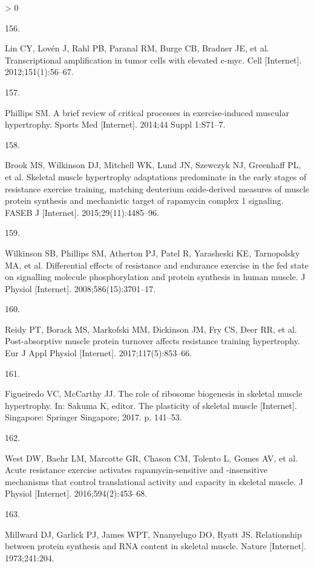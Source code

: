\documentclass[twoside,10pt]{gihclass} %
\newlength{\cslhangindent}
\newlength{\csllabelwidth}
\newenvironment{CSLReferences}[3] %
 {%
  \setlength{\parindent}{0pt}
  \ifodd #1 \everypar{\setlength{\hangindent}{\cslhangindent}}\ignorespaces\fi
  \ifnum #2 > 0
  \setlength{\parskip}{#2\baselineskip}
  \fi
 }%
 {}
\newcommand{\CSLLeftMargin}[1]{\parbox[t]{\maxof{\widthof{#1}}{\csllabelwidth}}{#1}}
\newcommand{\CSLRightInline}[1]{\parbox[t]{\linewidth}{#1}}
\begin{document}
\begin{CSLReferences}{0}{0}
\leavevmode\hypertarget{ref-RN2430}{}%
\CSLLeftMargin{156. }
\CSLRightInline{Lin CY, Lovén J, Rahl PB, Paranal RM, Burge CB, Bradner JE, et al. Transcriptional amplification in tumor cells with elevated c-myc. Cell {[}Internet{]}. 2012;151(1):56--67. }

\leavevmode\hypertarget{ref-RN1272}{}%
\CSLLeftMargin{157. }
\CSLRightInline{Phillips SM. A brief review of critical processes in exercise-induced muscular hypertrophy. Sports Med {[}Internet{]}. 2014;44 Suppl 1:S71--7. }

\leavevmode\hypertarget{ref-RN1642}{}%
\CSLLeftMargin{158. }
\CSLRightInline{Brook MS, Wilkinson DJ, Mitchell WK, Lund JN, Szewczyk NJ, Greenhaff PL, et al. Skeletal muscle hypertrophy adaptations predominate in the early stages of resistance exercise training, matching deuterium oxide-derived measures of muscle protein synthesis and mechanistic target of rapamycin complex 1 signaling. FASEB J {[}Internet{]}. 2015;29(11):4485--96. }

\leavevmode\hypertarget{ref-RN1866}{}%
\CSLLeftMargin{159. }
\CSLRightInline{Wilkinson SB, Phillips SM, Atherton PJ, Patel R, Yarasheski KE, Tarnopolsky MA, et al. Differential effects of resistance and endurance exercise in the fed state on signalling molecule phosphorylation and protein synthesis in human muscle. J Physiol {[}Internet{]}. 2008;586(15):3701--17. }

\leavevmode\hypertarget{ref-RN1897}{}%
\CSLLeftMargin{160. }
\CSLRightInline{Reidy PT, Borack MS, Markofski MM, Dickinson JM, Fry CS, Deer RR, et al. Post-absorptive muscle protein turnover affects resistance training hypertrophy. Eur J Appl Physiol {[}Internet{]}. 2017;117(5):853--66. }

\leavevmode\hypertarget{ref-RN1912}{}%
\CSLLeftMargin{161. }
\CSLRightInline{Figueiredo VC, McCarthy JJ. The role of ribosome biogenesis in skeletal muscle hypertrophy. In: Sakuma K, editor. The plasticity of skeletal muscle {[}Internet{]}. Singapore: Springer Singapore; 2017. p. 141--53. }

\leavevmode\hypertarget{ref-RN1754}{}%
\CSLLeftMargin{162. }
\CSLRightInline{West DW, Baehr LM, Marcotte GR, Chason CM, Tolento L, Gomes AV, et al. Acute resistance exercise activates rapamycin-sensitive and -insensitive mechanisms that control translational activity and capacity in skeletal muscle. J Physiol {[}Internet{]}. 2016;594(2):453--68. }

\leavevmode\hypertarget{ref-RN2145}{}%
\CSLLeftMargin{163. }
\CSLRightInline{Millward DJ, Garlick PJ, James WPT, Nnanyelugo DO, Ryatt JS. Relationship between protein synthesis and RNA content in skeletal muscle. Nature {[}Internet{]}. 1973;241:204. }


\end{CSLReferences}
\end{document}
